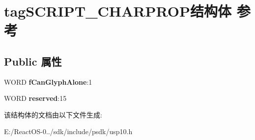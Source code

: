 \hypertarget{structtag_s_c_r_i_p_t___c_h_a_r_p_r_o_p}{}\section{tag\+S\+C\+R\+I\+P\+T\+\_\+\+C\+H\+A\+R\+P\+R\+O\+P结构体 参考}
\label{structtag_s_c_r_i_p_t___c_h_a_r_p_r_o_p}
\subsection*{Public 属性}
\begin{DoxyCompactItemize}
\item 
\mbox{\label{structtag_s_c_r_i_p_t___c_h_a_r_p_r_o_p_a533e3e801eae2a8dc0b356c7bd3b5e8a}} 
W\+O\+RD {\bfseries f\+Can\+Glyph\+Alone}\+:1
\item 
\mbox{\label{structtag_s_c_r_i_p_t___c_h_a_r_p_r_o_p_a5f20bb1feb97ca5e22ee57fc4571e1e6}} 
W\+O\+RD {\bfseries reserved}\+:15
\end{DoxyCompactItemize}


该结构体的文档由以下文件生成\+:\begin{DoxyCompactItemize}
\item 
E\+:/\+React\+O\+S-\/0../sdk/include/psdk/usp10.\+h\end{DoxyCompactItemize}
